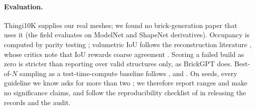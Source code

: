 \paragraph{Evaluation.} Thingi10K \citep{zhou2016thingi10k} supplies our real meshes; we found no brick-generation
paper that uses it (the field evaluates on ModelNet and ShapeNet derivatives). Occupancy is computed by parity
testing \citep{nooruddin2003voxelization}; volumetric IoU follows the reconstruction literature
\citep{choy2016r2n2,mescheder2019occnet}, whose critics note that IoU rewards coarse agreement
\citep{tatarchenko2019whatdonetworkslearn}. Scoring a failed build as zero is stricter than reporting over valid
structures only, as BrickGPT does. Best-of-$N$ sampling as a test-time-compute baseline follows
\citet{cobbe2021verifiers}, \citet{brown2024monkeys} and \citet{snell2024testtimecompute}. On seeds, every guideline we
know asks for more than two \citep{henderson2018drlmatters,colas2018howmanyseeds,agarwal2021precipice}; we therefore
report ranges and make no significance claims, and follow the reproducibility checklist of \citet{pineau2021reproducibility}
in releasing the records and the audit.
